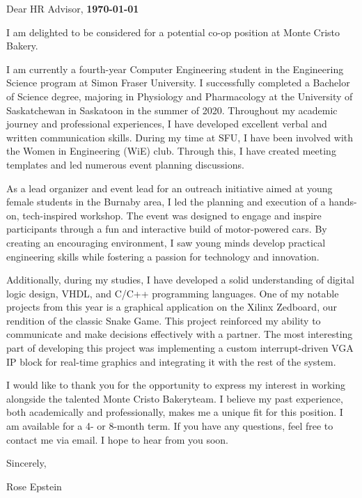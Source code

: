 \documentclass[letterpaper,11pt]{article}
\newcommand{\company}{Monte Cristo Bakery\hspace{4px}}
\begin{document}
    \vspace*{10pt}
    \par Dear HR Advisor,  \hfill \textbf{\today}
    \vspace*{10pt}
    \par I am delighted to be considered for a potential co-op position at \company{}.
    \vspace*{10pt}
    \par I am currently a fourth-year Computer Engineering student in the Engineering Science program at Simon Fraser University. I successfully
    completed a Bachelor of Science degree, majoring in Physiology and Pharmacology at the University of Saskatchewan in Saskatoon in the summer of 2020.
    Throughout my academic journey and professional experiences, I have developed excellent verbal and written communication skills. 
    During my time at SFU, I have been involved with the Women in Engineering (WiE) club. Through this, I have created meeting templates and led numerous event planning discussions. 
    \vspace*{10pt}
    \par As a lead organizer and event lead for an outreach initiative aimed at young female students in the Burnaby area, I led the planning and execution of a hands-on, tech-inspired workshop. 
    The event was designed to engage and inspire participants through a fun and interactive build of motor-powered cars. 
    By creating an encouraging environment, I saw young minds develop practical engineering skills while fostering a passion for technology and innovation.
    \vspace*{10pt}
    \par Additionally, during my studies, I have developed a solid understanding of digital logic design, VHDL, and C/C++ programming languages. 
    One of my notable projects from this year is a graphical application on the Xilinx Zedboard, our rendition of the classic Snake Game. This project reinforced 
    my ability to communicate and make decisions effectively with a partner. The most interesting part of developing this project was implementing a 
    custom interrupt-driven VGA IP block for real-time graphics and integrating it with the rest of the system.
    \vspace*{10pt}
    \par I would like to thank you for the opportunity to express my interest in working alongside
    the talented \company team. I believe my past experience, both academically and professionally, makes
    me a unique fit for this position. I am available for a 4- or 8-month term. If you have any questions, feel free to contact me via email. I hope to hear from you
    soon. 
    \vspace*{10pt}
    \par Sincerely,
    \par Rose Epstein
\end{document}
